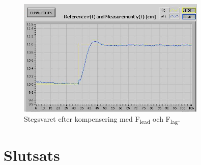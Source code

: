 \documentclass{article}
\begin{document}
\begin{figure}[ht!]
\centering
\includegraphics[width=90mm]{Test1_cut.jpg}
\caption{Stegsvaret efter kompensering med F\textsubscript{lead} och F\textsubscript{lag}.}
\label{overflow}
\end{figure}


\section{Slutsats}
\end{document}

